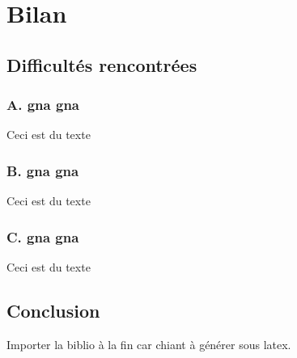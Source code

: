 \chapter{Bilan}

	\section{Difficultés rencontrées}   

		\subsection{ A. gna gna}
		
		Ceci est du texte
		
		\subsection{ B. gna gna}
		
		Ceci est du texte
		
		\subsection{ C. gna gna}
		
		Ceci est du texte
		
		\clearpage

	\section{Conclusion}
	
		Importer la biblio à la fin car chiant à générer sous latex.
		
		\clearpage